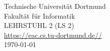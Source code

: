 \begin{titlepage}
        \center
        Technische Universität Dortmund \\
        Fakultät für Informatik\\
        LEHRSTUHL 2 (LS 2)\\
        \url{https://eac.cs.tu-dortmund.de//}\\
        { \today}



\end{titlepage}

